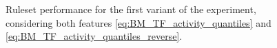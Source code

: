 \begin{figure}[h]
    \centering
    
    \caption{Ruleset performance for the first variant of the experiment,
        considering both features \eqref{eq:BM_TF_activity_quantiles} and \eqref{eq:BM_TF_activity_quantiles_reverse}.}
    \label{fig:pdl1ex1neg_accuracy}
\end{figure}

%    
